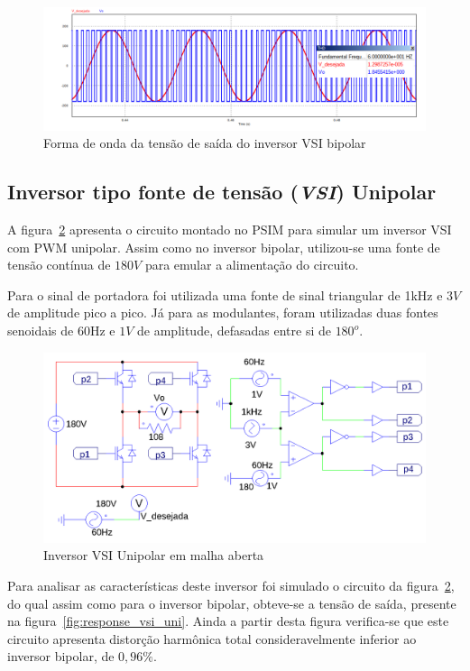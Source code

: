 \documentclass[
	12pt,				%
	openany,
	onseside,
	a4paper,			%
	english,			%
	french,				%
	spanish,			%
	brazil,				%
	]{abntex2}
\begin{document}
\begin{figure}[htbp]%
	\centering
		\includegraphics[width= \linewidth]{vsi_bip_out}
		\caption{Forma de onda da tensão de saída do inversor VSI bipolar}
		\label{fig:response_vsi_bip}
\end{figure}

\subsection{Inversor tipo fonte de tensão (\textit{VSI}) Unipolar}

A figura~\ref{fig:VSI_uni_circ} apresenta o circuito montado no PSIM para simular um inversor VSI com PWM unipolar. Assim como no inversor bipolar, utilizou-se uma fonte de tensão contínua de $180V$ para emular a alimentação do circuito.

Para o sinal de portadora foi utilizada uma fonte de sinal triangular de 1kHz e $3V$ de amplitude pico a pico. Já para as modulantes, foram utilizadas duas fontes senoidais de 60Hz e $1V$ de amplitude, defasadas entre si de $180^o$.

\begin{figure}[H]%
	\centering%
		\includegraphics[width=0.85 \linewidth]{vsi_unipolar_psim_circ}
		\caption{Inversor VSI Unipolar em malha aberta}
		\label{fig:VSI_uni_circ}
\end{figure}

Para analisar as características deste inversor foi simulado o circuito da figura~\ref{fig:VSI_uni_circ}, do qual assim como para o inversor bipolar, obteve-se a tensão de saída, presente na figura~\ref{fig:response_vsi_uni}. Ainda a partir desta figura verifica-se que este circuito apresenta distorção harmônica total consideravelmente inferior ao inversor bipolar, de $0,96\%$.
\end{document}
